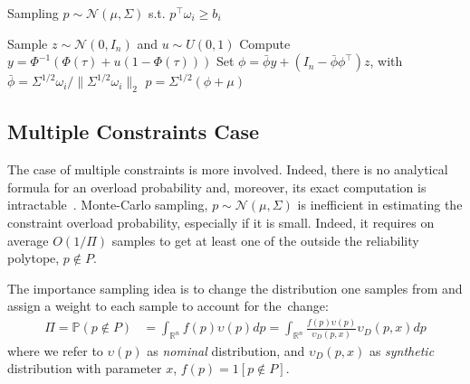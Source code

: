 \begin{algorithm}[H]
    \caption{Sampling $p\sim \mathcal{N}(\mu,\Sigma)$ s.t. $p^\top \omega_i \geq b_i$}
    \label{alg:sample1d}
    Sample $z \sim \mathcal{N}(0, I_n)$ and $u \sim U(0,1)$\;
    Compute $y = \Phi^{-1}(\Phi(\tau) + u(1 - \Phi(\tau)))$\;
    Set $\phi = \bar\phi y + (I_n - \bar\phi\phi^\top) z$, with $\bar\phi = \Sigma^{1/2} \omega_i / \|\Sigma^{1/2} \omega_i\|_2$\!\! \;
    \Return $p = \Sigma^{1/2} (\phi+\mu)$
\end{algorithm}

 
 \subsection{Multiple Constraints Case}
 
The case of multiple constraints is more involved. Indeed, there is no analytical formula for an overload probability and, moreover, its exact computation is intractable~\cite{khachiyan1989problem}. 
Monte-Carlo sampling, $p\sim \mathcal{N}(\mu, \Sigma)$ is inefficient in estimating the constraint overload probability, especially if it is small. Indeed, it requires on average $O(1/\Pi)$ samples to get at least one of the outside the reliability polytope, $p\not\in P$. 

The importance sampling idea is to change the distribution one samples from and assign a weight to each sample to account for the~change: 
\begin{align*}
    \Pi  = \mathbb{P}(p\not\in P) & = \int_{\mathbb{R}^n} f(p) \upsilon(p) dp = \!\int_{\mathbb{R}^n}\!\! \frac{f(p)\upsilon(p)}{\upsilon_D(p,x)}\upsilon_D(p,x) dp%
\end{align*}
where we refer to $\upsilon(p)$ as \emph{nominal} distribution, and $\upsilon_D(p,x)$ as \emph{synthetic} distribution with parameter $x$,  $f(p) = 1[p\not\in P]$. 

